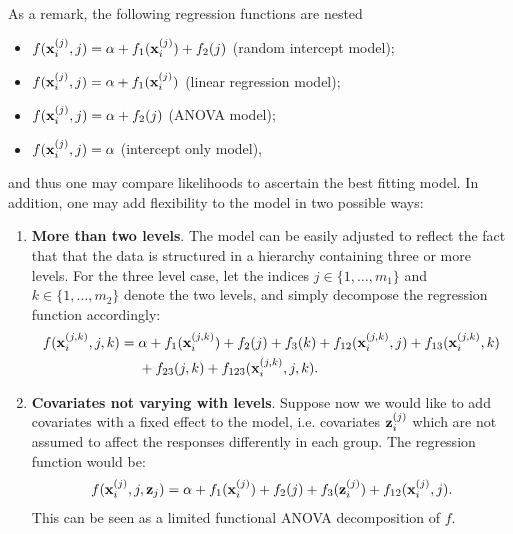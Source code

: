 As a remark, the following regression functions are nested 
\begin{itemize}
  \item $f({\mathbf x}_i^{(j)}, j) = \alpha + f_1({\mathbf x}_i^{(j)}) + f_2(j)$ (random intercept model);  %
  \item $f({\mathbf x}_i^{(j)}, j) = \alpha + f_1({\mathbf x}_i^{(j)})$ (linear regression model);
  \item $f({\mathbf x}_i^{(j)}, j) = \alpha + f_2(j)$ (ANOVA model);
  \item $f({\mathbf x}_i^{(j)}, j) = \alpha$ (intercept only model),
\end{itemize}
and thus one may compare likelihoods to ascertain the best fitting model.
In addition, one may add flexibility to the model in two possible ways:
\begin{enumerate}
  \item \textbf{More than two levels}. The model can be easily adjusted to reflect the fact that that the data is structured in a hierarchy containing three or more levels. For the three level case, let the indices $j\in\{1,\dots,m_1\}$ and $k\in\{1,\dots,m_2\}$ denote the two levels, and simply decompose the regression function accordingly:
  \begin{align*}
      f({\mathbf x}_i^{(j,k)}, j, k) ={}& \alpha + f_1({\mathbf x}_i^{(j,k)}) + f_2(j) + f_3(k) + f_{12}({\mathbf x}_i^{(j,k)}, j) + f_{13}({\mathbf x}_i^{(j,k)}, k)\\ 
      &+ f_{23}(j, k) + f_{123}({\mathbf x}_i^{(j,k)}, j, k).
  \end{align*}
  \item \textbf{Covariates not varying with levels}. Suppose now we would like to add covariates with a fixed effect to the model, i.e. covariates ${\mathbf z}_i^{(j)}$ which are not assumed to affect the responses differently in each group. The regression function would be:
  \begin{align*}
    \begin{gathered}
      f({\mathbf x}_i^{(j)}, j, {\mathbf z}_j) = \alpha + f_1({\mathbf x}_i^{(j)}) + f_2(j) + f_3({\mathbf z}_i^{(j)}) + f_{12}({\mathbf x}_i^{(j)}, j).
    \end{gathered}
  \end{align*}
  This can be seen as a limited functional ANOVA decomposition of $f$.
\end{enumerate}

